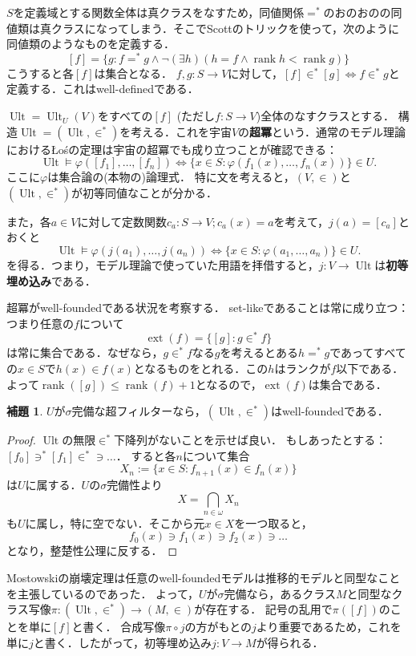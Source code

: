 \documentclass[uplatex]{jsarticle}
\newcommand{\rank}{\operatorname{rank}}
\newcommand{\Ult}{\operatorname{Ult}}
\newcommand{\ext}{\operatorname{ext}}
\theoremstyle{definition}
\newtheorem{lem}[thm]{補題}
\begin{document}
	$S$を定義域とする関数全体は真クラスをなすため，同値関係$=^*$のおのおのの同値類は真クラスになってしまう．そこでScottのトリックを使って，次のように同値類のようなものを定義する．
	\[
	[f] = 	\{ g : f =^* g \land \neg (\exists h)(h = f \land \rank h < \rank g) \}
	\]
	こうすると各$[f]$は集合となる．
	$f, g \colon S \to V$に対して，$[f] \in^* [g] \iff f \in^* g$と定義する．これはwell-definedである．
	
	$\Ult = \Ult_U(V)$をすべての$[f]$ (ただし$f \colon S \to V$)全体のなすクラスとする．
	構造$\Ult = (\Ult, \in^*)$を考える．これを宇宙$V$の\textbf{超冪}という．通常のモデル理論におけるŁośの定理は宇宙の超冪でも成り立つことが確認できる：
	\[
	\Ult \models \varphi([f_1], \dots, [f_n]) \iff \{ x \in S : \varphi(f_1(x), \dots, f_n(x)) \} \in U.
	\]
	ここに$\varphi$は集合論の(本物の)論理式．
	特に文を考えると，$(V, \in)$と$(\Ult, \in^*)$が初等同値なことが分かる．
	
	また，各$a \in V$に対して定数関数$c_a \colon S \to V; c_a(x) = a$を考えて，$j(a) = [c_a]$とおくと
	\[
	\Ult \models \varphi(j(a_1), \dots, j(a_n)) \iff \{ x \in S : \varphi(a_1, \dots, a_n) \} \in U.
	\]
	を得る．つまり，モデル理論で使っていた用語を拝借すると，$j \colon V \to \Ult$は\textbf{初等埋め込み}である．

	超冪がwell-foundedである状況を考察する．
	set-likeであることは常に成り立つ：つまり任意の$f$について
	\[
	\ext(f) = \{ [g] : g \in^* f \}
	\]
	は常に集合である．なぜなら，$g \in^* f$なる$g$を考えるとある$h =^* g$であってすべての$x \in S$で$h(x) \in f(x)$となるものをとれる．この$h$はランクが$f$以下である．よって$\rank([g]) \le \rank(f) + 1$となるので，$\ext(f)$は集合である．
	
	\begin{lem}
		$U$が$\sigma$完備な超フィルターなら，$(\Ult, \in^*)$はwell-foundedである．	
	\end{lem}
	\begin{proof}
		$\Ult$の無限$\in^*$下降列がないことを示せば良い．
		もしあったとする：$[f_0] \ni^* [f_1] \in^* \ni \dots$．
		すると各$n$について集合
		\[
			X_n := \{ x \in S : f_{n+1}(x) \in f_n(x) \}
		\]
		は$U$に属する．$U$の$\sigma$完備性より
		\[
			X = \bigcap_{n \in \omega} X_n
		\]
		も$U$に属し，特に空でない．そこから元$x \in X$を一つ取ると，
		\[
		f_0(x) \ni f_1(x) \ni f_2(x) \ni \dots
		\]
		となり，整楚性公理に反する．
	\end{proof}
	
	Mostowskiの崩壊定理は任意のwell-foundedモデルは推移的モデルと同型なことを主張しているのであった．
	よって，$U$が$\sigma$完備なら，あるクラス$M$と同型なクラス写像$\pi \colon (\Ult, \in^*) \to (M, \in)$が存在する．
	記号の乱用で$\pi([f])$のことを単に$[f]$と書く．
	合成写像$\pi \circ j$の方がもとの$j$より重要であるため，これを単に$j$と書く．したがって，初等埋め込み$j \colon V \to M$が得られる．
	
\end{document}
